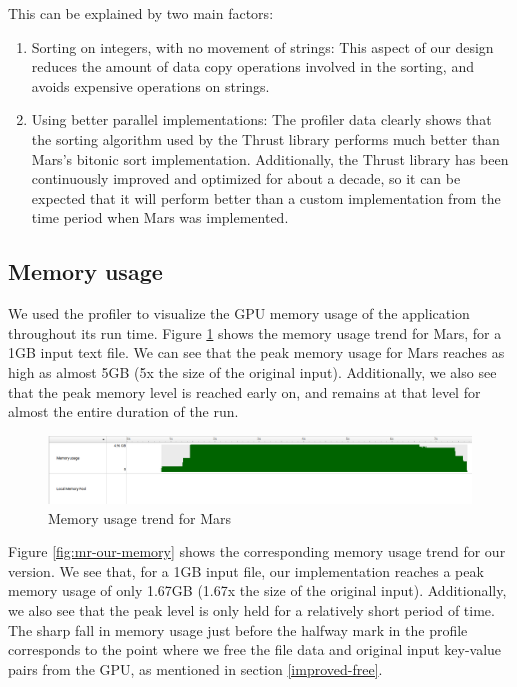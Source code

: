 \documentclass{article}
\begin{document}
This can be explained by two main factors:
\begin{enumerate}
    \item Sorting on integers, with no movement of strings: This aspect of our design reduces the amount of data copy operations involved in the sorting, and avoids expensive operations on strings.
    \item Using better parallel implementations: The profiler data clearly shows that the sorting algorithm used by the Thrust library performs much better than Mars's bitonic sort implementation. Additionally, the Thrust library has been continuously improved and optimized for about a decade, so it can be expected that it will perform better than a custom implementation from the time period when Mars was implemented.
\end{enumerate}


\subsection{Memory usage}
We used the profiler to visualize the GPU memory usage of the application throughout its run time. Figure \ref{fig:mr-mars-memory} shows the memory usage trend for Mars, for a 1GB input text file. We can see that the peak memory usage for Mars reaches as high as almost 5GB (5x the size of the original input). Additionally, we also see that the peak memory level is reached early on, and remains at that level for almost the entire duration of the run.

\begin{figure}
    \centering
    \includegraphics[width=1\linewidth]{images/mr-mars-memory.png}
    \caption{Memory usage trend for Mars}
    \label{fig:mr-mars-memory}
\end{figure}

Figure \ref{fig:mr-our-memory} shows the corresponding memory usage trend for our version. We see that, for a 1GB input file, our implementation reaches a peak memory usage of only 1.67GB (1.67x the size of the original input). Additionally, we also see that the peak level is only held for a relatively short period of time. The sharp fall in memory usage just before the halfway mark in the profile corresponds to the point where we free the file data and original input key-value pairs from the GPU, as mentioned in section \ref{improved-free}.
\end{document}
